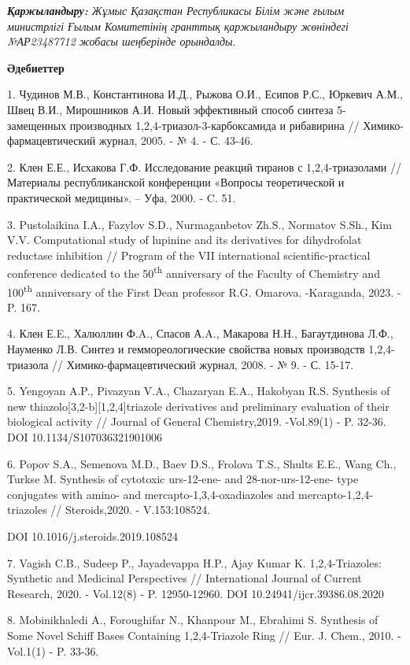 \emph{\textbf{Қаржыландыру:} Жұмыс Қазақстан Республикасы Білім және
ғылым министрлігі Ғылым Комитетінің гранттық қаржыландыру жөніндегі
№АР23487712 жобасы шеңберінде орындалды}.

\textbf{Әдебиеттер}

1. Чудинов М.В., Константинова И.Д., Рыжова О.И., Есипов Р.С., Юркевич
А.М., Швец В.И., Мирошников А.И. Новый эффективный способ синтеза
5-замещенных производных 1,2,4-триазол-3-карбоксамида и рибавирина //
Химико-фармацевтический журнал, 2005. - № 4. - С. 43-46.

2. Клен Е.Е., Исхакова Г.Ф. Исследование реакций тиранов с
1,2,4-триазолами // Материалы республиканской конференции «Вопросы
теоретической и практической медицины». -- Уфа, 2000. - C. 51.

3. Pustolaikina I.A., Fazylov S.D., Nurmaganbetov Zh.S., Normatov S.Sh.,
Kim V.V. Computational study of lupinine and its derivatives for
dihydrofolat reductase inhibition // Program of the VII international
scientific-practical conference dedicated to the 50\textsuperscript{th}
anniversary of the Faculty of Chemistry and 100\textsuperscript{th}
anniversary of the First Dean professor R.G. Omarova. -Karaganda, 2023.
- P. 167.

4. Клен Е.E., Халюллин Ф.A., Спасов А.A., Макарова Н.Н., Багаутдинова
Л.Ф., Науменко Л.В. Синтез и геммореологические свойства новых
производств 1,2,4-триазола // Химико-фармацевтический журнал, 2008. - №
9. - С. 15-17.

5. Yengoyan A.P., Pivazyan V.A., Chazaryan E.A., Hakobyan R.S. Synthesis
of new thiazolo{[}3,2-b{]}{[}1,2,4{]}triazole derivatives and
preliminary evaluation of their biological activity // Journal of
General Chemistry,2019. -Vol.89(1) - P. 32-36. DOI
10.1134/S107036321901006

6. Popov S.A., Semenova M.D., Baev D.S., Frolova T.S., Shults E.E., Wang
Ch., Turkse M. Synthesis of cytotoxic urs-12-ene- and 28-nor-urs-12-ene-
type conjugates with amino- and mercapto-1,3,4-oxadiazoles and
mercapto-1,2,4-triazoles // Steroids,2020. - V.153:108524.

DOI 10.1016/j.steroids.2019.108524

7. Vagish C.B., Sudeep P., Jayadevappa H.P., Ajay Kumar K.
1,2,4-Triazoles: Synthetic and Medicinal Perspectives // International
Journal of Current Research, 2020. - Vol.12(8) - P. 12950-12960. DOI
10.24941/ijcr.39386.08.2020

8. Mobinikhaledi A., Foroughifar N., Khanpour M., Ebrahimi S. Synthesis
of Some Novel Schiff Bases Containing 1,2,4-Triazole Ring // Eur. J.
Chem., 2010. -Vol.1(1) - P. 33-36.

